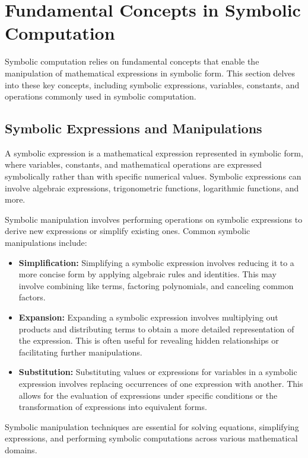 
\section{Fundamental Concepts in Symbolic Computation}
\label{chap2:sec:concepts}

Symbolic computation relies on fundamental concepts that enable the manipulation of mathematical expressions in symbolic form. This section delves into these key concepts, including symbolic expressions, variables, constants, and operations commonly used in symbolic computation.

\subsection{Symbolic Expressions and Manipulations}

A symbolic expression is a mathematical expression represented in symbolic form, where variables, constants, and mathematical operations are expressed symbolically rather than with specific numerical values. Symbolic expressions can involve algebraic expressions, trigonometric functions, logarithmic functions, and more.

Symbolic manipulation involves performing operations on symbolic expressions to derive new expressions or simplify existing ones. Common symbolic manipulations include:
%
\begin{itemize}
  \item \textbf{Simplification:} Simplifying a symbolic expression involves reducing it to a more concise form by applying algebraic rules and identities. This may involve combining like terms, factoring polynomials, and canceling common factors.
  \item \textbf{Expansion:} Expanding a symbolic expression involves multiplying out products and distributing terms to obtain a more detailed representation of the expression. This is often useful for revealing hidden relationships or facilitating further manipulations.
  \item \textbf{Substitution:} Substituting values or expressions for variables in a symbolic expression involves replacing occurrences of one expression with another. This allows for the evaluation of expressions under specific conditions or the transformation of expressions into equivalent forms.
\end{itemize}
%
Symbolic manipulation techniques are essential for solving equations, simplifying expressions, and performing symbolic computations across various mathematical domains.

